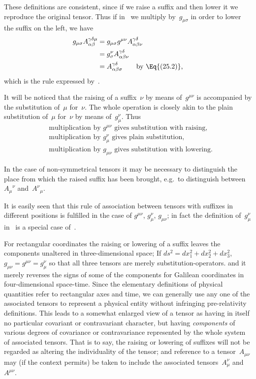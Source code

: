 \documentclass[12pt]{book}
\begin{document}
These definitions are consistent, since if we raise a suffix and then lower
it we reproduce the original tensor. Thus if in~ we multiply by~$g_{\mu\sigma}$ in
order to lower the suffix on the left, we have
\begin{align*}
  g_{\mu\sigma} A_{\alpha\beta}^{\gamma\delta\mu}
  &= g_{\mu\sigma} g^{\mu\nu} A_{\alpha\beta\nu}^{\gamma\delta} \\
  &= g_{\sigma}^{\nu} A_{\alpha\beta\nu}^{\gamma\delta} \\
  &= A_{\alpha\beta\sigma}^{\gamma\delta}\qquad\text{by \Eq{(25.2)},}
\end{align*}
which is the rule expressed by~.

It will be noticed that the raising of a suffix~$\nu$ by means of~$g^{\mu\nu}$ is accompanied
by the substitution of~$\mu$ for~$\nu$. The whole operation is closely akin to
the plain substitution of~$\mu$ for~$\nu$ by means of~$g_{\mu}^{\nu}$. Thus
\begin{align*}
  &\text{multiplication by $g^{\mu\nu}$ gives substitution with raising,} \\
  &\text{multiplication by $g_{\mu}^{\nu}$ gives plain substitution,} \\
  &\text{multiplication by $g_{\mu\nu}$ gives substitution with lowering.}
\end{align*}

In the case of non-symmetrical tensors it may be necessary to distinguish
the place from which the raised suffix has been brought, e.g.\ to distinguish
between ${A_{\mu}}^{\nu}$ and~${A^{\nu}}_{\mu}$.

It is easily seen that this rule of association between tensors with suffixes
in different positions is fulfilled in the case of $g^{\mu\nu}$, $g_{\mu}^{\nu}$, $g_{\mu\nu}$; in fact the definition
of~$g_{\mu}^{\nu}$ in~ is a special case of~.

For rectangular coordinates the raising or lowering of a suffix leaves the
components unaltered in three-dimensional space\footnotemark;\footnotetext
  {If $ds^{2} = dx_{1}^{2} + dx_{2}^{2} + dx_{3}^{2}$, $g_{\mu\nu} = g^{\mu\nu} = g_{\mu}^{\nu}$ so that all three tensors are merely substitution-operators.}
and it merely reverses
%
the signs of some of the components for Galilean coordinates in four-dimensional
space-time. Since the elementary definitions of physical
quantities refer to rectangular axes and time, we can generally use any one
of the associated tensors to represent a physical entity without infringing
pre-relativity definitions. This leads to a somewhat enlarged view of a tensor
as having in itself no particular covariant or contravariant character, but
having \emph{components} of various degrees of covariance or contravariance represented
by the whole system of associated tensors. That is to say, the raising
or lowering of suffixes will not be regarded as altering the individuality of
the tensor; and reference to a tensor~$A_{\mu\nu}$ may (if the context permits) be
taken to include the associated tensors~$A_{\mu}^{\nu}$ and~$A^{\mu\nu}$.
\end{document}
